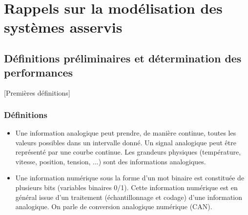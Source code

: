 \setchapterpreamble[u]{\margintoc}

\chapter{Rappels sur la modélisation des systèmes asservis}






\section{Définitions préliminaires et détermination des performances}[Premières définitions]

\subsection{Définitions}


\begin{defi} 

\begin{itemize}%
\item Une information analogique peut prendre, de manière continue, toutes les valeurs
possibles dans un intervalle donné. Un signal analogique peut être représenté
par une courbe continue. Les grandeurs physiques (température, vitesse,
position, tension, ...) sont des informations analogiques.

\item Une information numérique sous la forme d'un mot binaire est constituée de
plusieurs bits (variables binaires 0/1). Cette information numérique est en
général issue d'un traitement (échantillonnage et codage) d'une information
analogique. On parle de conversion analogique numérique (CAN).
\end{itemize}
\end{defi}

